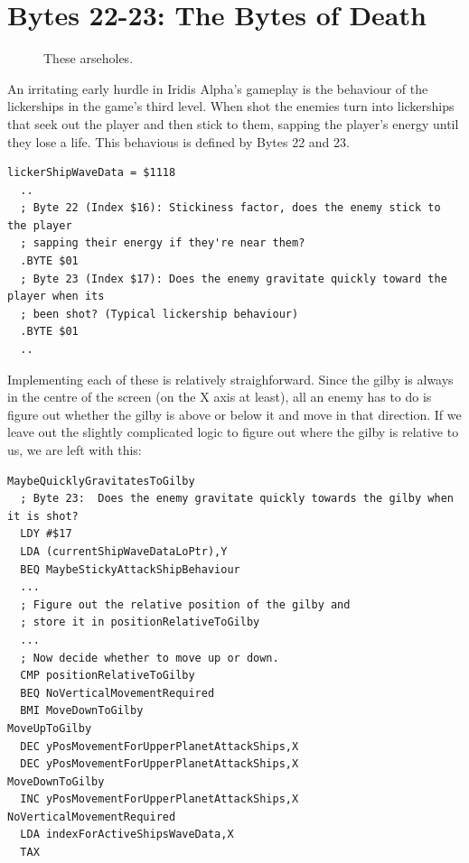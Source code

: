 \section{Bytes 22-23: The Bytes of Death}
\begin{figure}[H]
  {
    \setlength{\tabcolsep}{3.0pt}
    \setlength\cmidrulewidth{\heavyrulewidth} %
	\centering
	\def\MULTICOLORONE{white}
	\def\MULTICOLORTWO{red}
	\def\SPRITECOLOR{gray}
	\begin{subfigure}{0.3\textwidth}
		
	\end{subfigure}
	\begin{subfigure}{0.3\textwidth}
		
	\end{subfigure}
	\begin{subfigure}{0.3\textwidth}
		
	\end{subfigure}
  }\caption[position=top]{These arseholes.}
\end{figure}

An irritating early hurdle in Iridis Alpha's gameplay is the behaviour of the lickerships in the game's third level.
When shot the enemies turn into lickerships that seek out the player and then stick to them, sapping the player's energy
until they lose a life. This behavious is defined by Bytes 22 and 23. 

\begin{lstlisting}
lickerShipWaveData = $1118
  ..
  ; Byte 22 (Index $16): Stickiness factor, does the enemy stick to the player
  ; sapping their energy if they're near them?
  .BYTE $01
  ; Byte 23 (Index $17): Does the enemy gravitate quickly toward the player when its
  ; been shot? (Typical lickership behaviour)
  .BYTE $01
  ..
\end{lstlisting}

Implementing each of these is relatively straighforward. Since the gilby is always in the centre of the screen (on the
X axis at least), all an enemy has to do is figure out whether the gilby is above or below it and move in that direction.
If we leave out the slightly complicated logic to figure out where the gilby is relative to us, we are left with this:

\begin{lstlisting}
MaybeQuicklyGravitatesToGilby
  ; Byte 23:  Does the enemy gravitate quickly towards the gilby when it is shot?
  LDY #$17
  LDA (currentShipWaveDataLoPtr),Y
  BEQ MaybeStickyAttackShipBehaviour
  ...
  ; Figure out the relative position of the gilby and
  ; store it in positionRelativeToGilby
  ...
  ; Now decide whether to move up or down.
  CMP positionRelativeToGilby
  BEQ NoVerticalMovementRequired
  BMI MoveDownToGilby
MoveUpToGilby
  DEC yPosMovementForUpperPlanetAttackShips,X
  DEC yPosMovementForUpperPlanetAttackShips,X
MoveDownToGilby
  INC yPosMovementForUpperPlanetAttackShips,X
NoVerticalMovementRequired
  LDA indexForActiveShipsWaveData,X
  TAX
\end{lstlisting}

